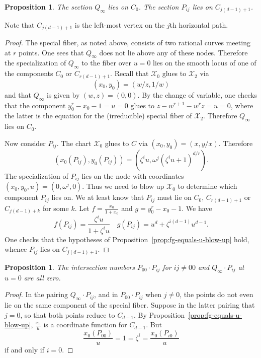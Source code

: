 \documentclass[reqno]{amsart}
\newtheorem{proposition}[thm]{Proposition}
\theoremstyle{definition}
\theoremstyle{remark}
\def\XX{\mathcal{X}}
\begin{document}
\begin{proposition}
  The section $Q_\infty$ lies on $C_0$. The section $P_{ij}$ lies on $C_{j(d-1)+1}$.
\end{proposition}

Note that $C_{j(d-1)+1}$ is the left-most vertex on the $j$th horizontal path.

\begin{proof}
   The special fiber, as noted above, consists of two rational curves meeting at $r$ points. One sees that $Q_\infty$ does not lie above any of these nodes. Therefore the specialization of $Q_\infty$ to the fiber over $u = 0$ lies on the smooth locus of one of the components $C_0$ or $C_{r(d-1)+1}$. Recall that $\XX_0$ glues to $\XX_2$ via
  \[
  (x_0, y_0) = (w/z, 1/w)
  \]
  and that $Q_\infty$ is given by $(w, z) = (0, 0)$. By the change of variable, one checks that the component $y_0^r - x_0 - 1 = u = 0$ glues to $z - w^{r+1} - w^rz = u = 0$, where the latter is the equation for the (irreducible) special fiber of $\XX_2$. Therefore $Q_\infty$ lies on $C_0$.

  Now consider $P_{ij}$. The chart $\XX_0$ glues to $C$ via $(x_0, y_0) = (x, y/x)$. Therefore
  \[
  (x_0(P_{ij}), y_0(P_{ij})) = (\zeta^i u, \omega^j(\zeta^iu + 1)^{d/r}).
  \]
  The specialization of $P_{ij}$ lies on the node with coordinates $(x_0, y_0, u) = (0, \omega^j, 0)$. Thus we need to blow up $\XX_0$ to determine which component $P_{ij}$ lies on. We at least know that $P_{ij}$ must lie on $C_0$, $C_{r(d-1)+1}$ or $C_{j(d-1) + k}$ for some $k$. Let $f = \frac{x_0}{1+x_0}$ and $g = y_0^r - x_0 - 1$. We have
  \[
  f(P_{ij}) = \frac{\zeta^i u}{1 + \zeta^i u} \quad g(P_{ij}) = u^d + \zeta^{i(d-1)} u^{d-1}.
  \]
  One checks that the hypotheses of Proposition~\ref{prop:fg-equals-u-blow-up} hold, whence $P_{ij}$ lies on $C_{j(d-1)+1}$.
\end{proof}

\begin{proposition}\label{prop:local-intersections-u-0}
  The intersection numbers $P_{00} \cdot P_{ij}$ for $ij \neq 00$ and $Q_{\infty} \cdot P_{ij}$ at $u = 0$ are all zero.
\end{proposition}

\begin{proof}
  In the pairing $Q_\infty \cdot P_{ij}$, and in $P_{00} \cdot P_{ij}$ when $j \neq 0$, the points do not even lie on the same component of the special fiber. Suppose in the latter pairing that $j = 0$, so that both points reduce to $C_{d-1}$. By Proposition~\ref{prop:fg-equals-u-blow-up}, $\frac{x_0}{u}$ is a coordinate function for $C_{d-1}$. But
  \[
  \frac{x_0(P_{00})}{u} = 1 = \zeta^i = \frac{x_0(P_{i0})}{u}
  \]
  if and only if $i = 0$.
\end{proof}
\end{document}
